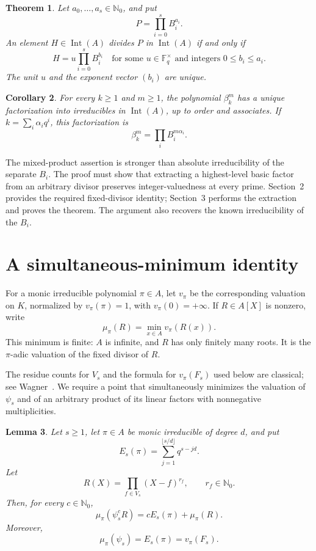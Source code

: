\documentclass[11pt]{article}
\newtheorem{theorem}{Theorem}[section]
\newtheorem{lemma}[theorem]{Lemma}
\newtheorem{corollary}[theorem]{Corollary}
\theoremstyle{remark}
\newcommand{\Int}{\operatorname{Int}}
\newcommand{\F}{\mathbb F}
\newcommand{\Nzero}{\mathbb N_0}
\begin{document}
\begin{theorem}\label{thm:main}
Let $a_0,\ldots,a_s\in\Nzero$, and put
\[
 P=\prod_{i=0}^s B_i^{a_i}.
\]
An element $H\in\Int(A)$ divides $P$ in $\Int(A)$ if and only if
\begin{equation}\label{eq:divisor}
 H=u\prod_{i=0}^sB_i^{b_i}
 \quad\text{for some }u\in\F_q^\times
 \text{ and integers }0\leq b_i\leq a_i.
\end{equation}
The unit $u$ and the exponent vector $(b_i)$ are unique.
\end{theorem}

\begin{corollary}\label{cor:question}
For every $k\geq1$ and $m\geq1$, the polynomial $\beta_k^m$ has a unique factorization into irreducibles in $\Int(A)$, up to order and associates. If $k=\sum_i\alpha_iq^i$, this factorization is
\[
 \beta_k^m=\prod_iB_i^{m\alpha_i}.
\]
\end{corollary}

The mixed-product assertion is stronger than absolute irreducibility of the separate $B_i$. The proof must show that extracting a highest-level basic factor from an arbitrary divisor preserves integer-valuedness at every prime. Section~2 provides the required fixed-divisor identity; Section~3 performs the extraction and proves the theorem. The argument also recovers the known irreducibility of the $B_i$.

\section{A simultaneous-minimum identity}

For a monic irreducible polynomial $\pi\in A$, let $v_\pi$ be the corresponding valuation on $K$, normalized by $v_\pi(\pi)=1$, with $v_\pi(0)=+\infty$. If $R\in A[X]$ is nonzero, write
\[
 \mu_\pi(R)=\min_{x\in A}v_\pi(R(x)).
\]
This minimum is finite: $A$ is infinite, and $R$ has only finitely many roots. It is the $\pi$-adic valuation of the fixed divisor of $R$.

The residue counts for $V_s$ and the formula for $v_\pi(F_s)$ used below are classical; see Wagner~\cite[p.~51]{Wagner}. We require a point that simultaneously minimizes the valuation of $\psi_s$ and of an arbitrary product of its linear factors with nonnegative multiplicities.

\begin{lemma}\label{lem:min}
Let $s\geq1$, let $\pi\in A$ be monic irreducible of degree $d$, and put
\[
 E_s(\pi)=\sum_{j=1}^{\lfloor s/d\rfloor}q^{s-jd}.
\]
Let
\[
 R(X)=\prod_{f\in V_s}(X-f)^{r_f},\qquad r_f\in\Nzero.
\]
Then, for every $c\in\Nzero$,
\begin{equation}\label{eq:min}
 \mu_\pi(\psi_s^cR)=cE_s(\pi)+\mu_\pi(R).
\end{equation}
Moreover,
\begin{equation}\label{eq:fixed}
 \mu_\pi(\psi_s)=E_s(\pi)=v_\pi(F_s).
\end{equation}
\end{lemma}
\end{document}
